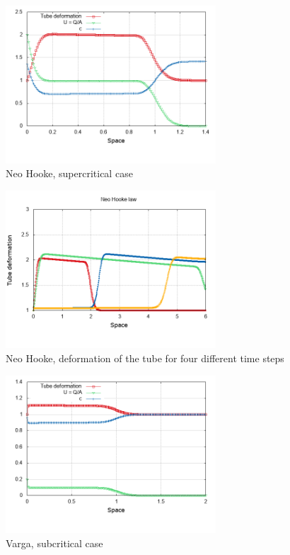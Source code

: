 \documentclass[12pt,a4paper]{article}
\numberwithin{equation}{section}
\begin{document}
\begin{figure}[H]
	\centering
    \includegraphics[width=0.7\textwidth]{NH_Q2_super.png}
    \caption{Neo Hooke, supercritical case}
    \label{fig:NH_super}
\end{figure}
\begin{figure}[H]
	\centering
    \includegraphics[width=0.7\textwidth]{NH_Q1.png}
    \caption{Neo Hooke, deformation of the tube for four different time steps}
    \label{fig:NH_flux}
\end{figure}
\begin{figure}[H]
  \centering
    \includegraphics[width=0.7\textwidth]{Varga_Q02_sub.png}
    \caption{Varga, subcritical case}
    \label{fig:Varga_sub}
\end{figure}
\end{document}
